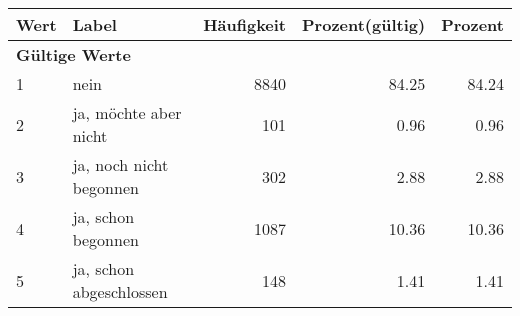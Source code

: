      \begin{longtable}{lXrrr}
     \toprule
     \textbf{Wert} & \textbf{Label} & \textbf{Häufigkeit} & \textbf{Prozent(gültig)} & \textbf{Prozent} \\
     \endhead
     \midrule
     \multicolumn{5}{l}{\textbf{Gültige Werte}}\\

     1 &
     \multicolumn{1}{X}{ nein   } &


       \num{8840} &
       \num[round-mode=places,round-precision=2]{84.25} &
         \num[round-mode=places,round-precision=2]{84.24} \\

     2 &
     \multicolumn{1}{X}{ ja, möchte aber nicht   } &


       \num{101} &
       \num[round-mode=places,round-precision=2]{0.96} &
         \num[round-mode=places,round-precision=2]{0.96} \\

     3 &
     \multicolumn{1}{X}{ ja, noch nicht begonnen   } &


       \num{302} &
       \num[round-mode=places,round-precision=2]{2.88} &
         \num[round-mode=places,round-precision=2]{2.88} \\

     4 &
     \multicolumn{1}{X}{ ja, schon begonnen   } &


       \num{1087} &
       \num[round-mode=places,round-precision=2]{10.36} &
         \num[round-mode=places,round-precision=2]{10.36} \\

     5 &
     \multicolumn{1}{X}{ ja, schon abgeschlossen   } &


       \num{148} &
       \num[round-mode=places,round-precision=2]{1.41} &
         \num[round-mode=places,round-precision=2]{1.41} \\


\end{longtable}
